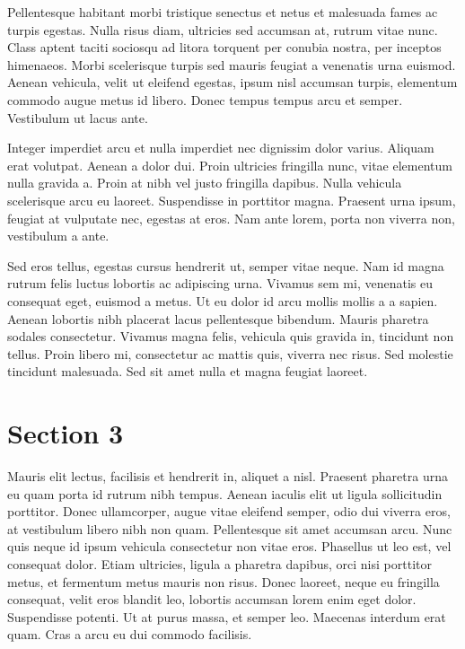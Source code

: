 Pellentesque habitant morbi tristique senectus et netus et malesuada fames ac turpis egestas. Nulla risus diam,
ultricies sed accumsan at, rutrum vitae nunc. Class aptent taciti sociosqu ad litora torquent per conubia nostra, per
inceptos himenaeos. Morbi scelerisque turpis sed mauris feugiat a venenatis urna euismod. Aenean vehicula, velit ut
eleifend egestas, ipsum nisl accumsan turpis, elementum commodo augue metus id libero. Donec tempus tempus arcu et
semper. Vestibulum ut lacus ante.

Integer imperdiet arcu et nulla imperdiet nec dignissim dolor varius. Aliquam erat volutpat. Aenean a dolor dui. Proin
ultricies fringilla nunc, vitae elementum nulla gravida a. Proin at nibh vel justo fringilla dapibus. Nulla vehicula
scelerisque arcu eu laoreet. Suspendisse in porttitor magna. Praesent urna ipsum, feugiat at vulputate nec, egestas at
eros. Nam ante lorem, porta non viverra non, vestibulum a ante.

Sed eros tellus, egestas cursus hendrerit ut, semper vitae neque. Nam id magna rutrum felis luctus lobortis ac
adipiscing urna. Vivamus sem mi, venenatis eu consequat eget, euismod a metus. Ut eu dolor id arcu mollis mollis a a
sapien. Aenean lobortis nibh placerat lacus pellentesque bibendum. Mauris pharetra sodales consectetur. Vivamus magna
felis, vehicula quis gravida in, tincidunt non tellus. Proin libero mi, consectetur ac mattis quis, viverra nec risus.
Sed molestie tincidunt malesuada. Sed sit amet nulla et magna feugiat laoreet.

\section{Section 3}

Mauris elit lectus, facilisis et hendrerit in, aliquet a nisl. Praesent pharetra urna eu quam porta id rutrum nibh
tempus. Aenean iaculis elit ut ligula sollicitudin porttitor. Donec ullamcorper, augue vitae eleifend semper, odio dui
viverra eros, at vestibulum libero nibh non quam. Pellentesque sit amet accumsan arcu. Nunc quis neque id ipsum vehicula
consectetur non vitae eros. Phasellus ut leo est, vel consequat dolor. Etiam ultricies, ligula a pharetra dapibus, orci
nisi porttitor metus, et fermentum metus mauris non risus. Donec laoreet, neque eu fringilla consequat, velit eros
blandit leo, lobortis accumsan lorem enim eget dolor. Suspendisse potenti. Ut at purus massa, et semper leo. Maecenas
interdum erat quam. Cras a arcu eu dui commodo facilisis.


